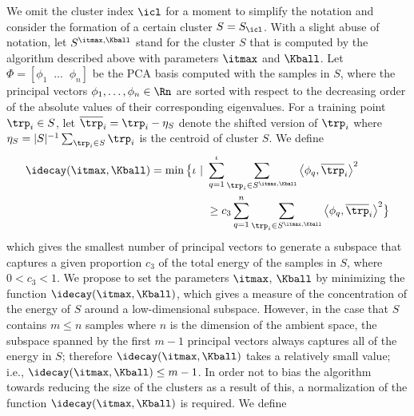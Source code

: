 \documentclass[journal]{IEEEtran}
\begin{document}
We omit the cluster index $\icl$ for a moment to simplify the notation and consider the formation of a certain cluster $S=S_\icl$. With a slight abuse of notation, let  $S^{\itmax,\Kball} $ stand for the cluster $S$ that is computed by the algorithm described above with parameters $\itmax$ and $\Kball$. Let $\Phi=\left[\phi_1\;\;...\;\;\phi_n\right]$ be the PCA basis computed with the samples in $S$, where  the principal vectors $\phi_1, \dots, \phi_n \in \Rn$ are sorted with respect to the decreasing order of the absolute values of their corresponding eigenvalues. For a training point $\trp_i \in S$, let $\overline \trp_i = \trp_i - \eta_S $ denote the shifted version of $\trp_i$ where $\eta_S=|S|^{-1} \sum_{\trp_i \in S} \trp_i$ is the centroid of cluster $S$. We define
%
\begin{equation}
	\label{eqn:funclb}
	\begin{split}	
	\idecay(\itmax, \Kball)
	 =\min \big \{  \iota\ |\
	 &\sum_{q=1}^{\iota}
	 {\sum_{\trp_i \in S^{\itmax,\Kball}  }{\left\langle \phi_q,  \overline \trp_i \right\rangle^2}} \\
	 &\geq
	  c_3\sum_{q=1}^{n}
	  {\sum_{\trp_i \in S^{\itmax,\Kball} } {\left\langle \phi_q , \overline \trp_i \right\rangle^2}} 
	  \big \}
	  \end{split}
\end{equation}
%
%
which gives the smallest number of principal vectors to generate a subspace that captures a given proportion $c_3$ of the total energy of the samples in $S$, where $0<c_3<1$. We propose to set the parameters $\itmax$, $\Kball $ by minimizing the function $\idecay(\itmax, \Kball)$, which gives a measure of the concentration of the energy of $S$ around a low-dimensional subspace. However, in the case that $S$ contains $m \leq n$ samples where $n$ is the dimension of the ambient space, the subspace spanned by the first $m-1$ principal vectors always captures all of the energy in $S$; therefore $\idecay(\itmax, \Kball)$ takes a relatively small value; i.e., $\idecay(\itmax, \Kball) \leq m-1$.  In order not to bias the algorithm towards reducing the size of the clusters as a result of this, a normalization of the function $\idecay(\itmax, \Kball)$ is required. We define 
\end{document}

